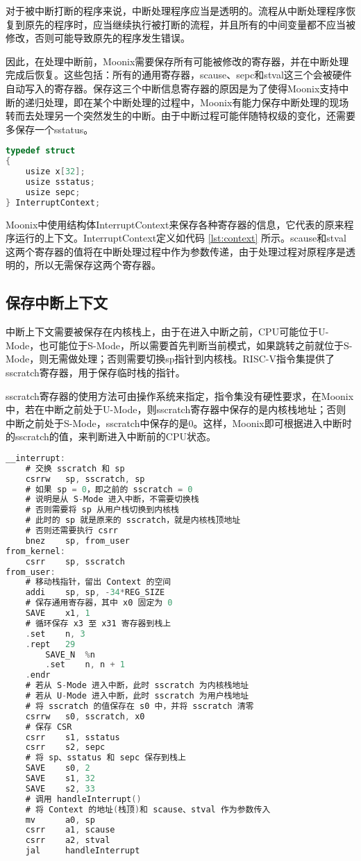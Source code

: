 对于被中断打断的程序来说，中断处理程序应当是透明的。流程从中断处理程序恢复到原先的程序时，应当继续执行被打断的流程，并且所有的中间变量都不应当被修改，否则可能导致原先的程序发生错误。

因此，在处理中断前，Moonix需要保存所有可能被修改的寄存器，并在中断处理完成后恢复。这些包括：所有的通用寄存器，scause、sepc和stval这三个会被硬件自动写入的寄存器。保存这三个中断信息寄存器的原因是为了使得Moonix支持中断的递归处理，即在某个中断处理的过程中，Moonix有能力保存中断处理的现场转而去处理另一个突然发生的中断。由于中断过程可能伴随特权级的变化，还需要多保存一个sstatus。

\begin{lstlisting}[language={C}, caption={上下文结构定义}, label={lst:context}]
typedef struct
{
	usize x[32];
	usize sstatus;
	usize sepc;
} InterruptContext;
\end{lstlisting}

Moonix中使用结构体InterruptContext来保存各种寄存器的信息，它代表的原来程序运行的上下文。InterruptContext定义如代码 \ref{lst:context} 所示。scause和stval这两个寄存器的值将在中断处理过程中作为参数传递，由于处理过程对原程序是透明的，所以无需保存这两个寄存器。

\subsection{保存中断上下文}

中断上下文需要被保存在内核栈上，由于在进入中断之前，CPU可能位于U-Mode，也可能位于S-Mode，所以需要首先判断当前模式，如果跳转之前就位于S-Mode，则无需做处理；否则需要切换sp指针到内核栈。RISC-V指令集提供了sscratch寄存器，用于保存临时栈的指针。

sscratch寄存器的使用方法可由操作系统来指定，指令集没有硬性要求，在Moonix中，若在中断之前处于U-Mode，则sscratch寄存器中保存的是内核栈地址；否则中断之前处于S-Mode，sscratch中保存的是0。这样，Moonix即可根据进入中断时的sscratch的值，来判断进入中断前的CPU状态。

\clearpage

\begin{lstlisting}[language={C}, caption={保存中断上下文}, label={lst:savecontext}]
__interrupt:
	# 交换 sscratch 和 sp
	csrrw   sp, sscratch, sp
	# 如果 sp = 0，即之前的 sscratch = 0
	# 说明是从 S-Mode 进入中断，不需要切换栈
	# 否则需要将 sp 从用户栈切换到内核栈
	# 此时的 sp 就是原来的 sscratch，就是内核栈顶地址
	# 否则还需要执行 csrr 
	bnez    sp, from_user
from_kernel:
	csrr    sp, sscratch
from_user:
	# 移动栈指针，留出 Context 的空间
	addi    sp, sp, -34*REG_SIZE
	# 保存通用寄存器，其中 x0 固定为 0
	SAVE    x1, 1
	# 循环保存 x3 至 x31 寄存器到栈上
	.set    n, 3
	.rept   29
		SAVE_N  %n
		.set    n, n + 1
	.endr
	# 若从 S-Mode 进入中断，此时 sscratch 为内核栈地址
	# 若从 U-Mode 进入中断，此时 sscratch 为用户栈地址
	# 将 sscratch 的值保存在 s0 中，并将 sscratch 清零
	csrrw   s0, sscratch, x0
	# 保存 CSR
	csrr    s1, sstatus
	csrr    s2, sepc
	# 将 sp、sstatus 和 sepc 保存到栈上 
	SAVE    s0, 2
	SAVE    s1, 32
	SAVE    s2, 33
	# 调用 handleInterrupt()
	# 将 Context 的地址(栈顶)和 scause、stval 作为参数传入
	mv      a0, sp
	csrr    a1, scause
	csrr    a2, stval
	jal     handleInterrupt
\end{lstlisting}

